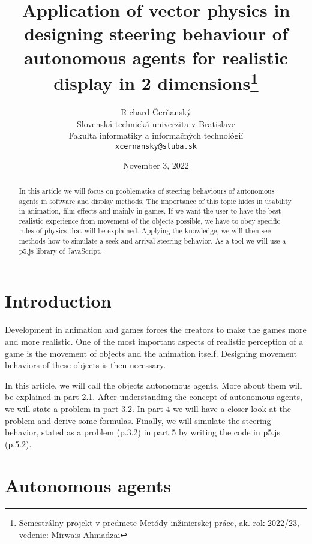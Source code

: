 \documentclass[10pt,twoside,slovak,a4paper]{article}
\title{Application of vector physics in designing steering behaviour of autonomous agents for realistic display in 2 dimensions\thanks{Semestrálny projekt v predmete Metódy inžinierskej práce, ak. rok 2022/23, vedenie: Mirwais Ahmadzai}}
\author{Richard Čerňanský\\[2pt]
	{\small Slovenská technická univerzita v Bratislave}\\
	{\small Fakulta informatiky a informačných technológií}\\
	{\small \texttt{xcernansky@stuba.sk}}
	}
\date{\small November 3, 2022 }
\begin{document}
\maketitle

\begin{abstract}

In this article we will focus on problematics of steering behaviours of autonomous agents in software and display methods. The importance of this topic hides in usability in animation, film effects and mainly in games. If we want the user to have the best realistic experience from movement of the objects possible, we have to obey specific rules of physics that will be explained. Applying the knowledge, we will then see methods how to simulate a seek and arrival steering behavior. As a tool we will use a p5.js library of JavaScript.

\end{abstract}


\section{Introduction}

Development in animation and games forces the creators to make the games more and more realistic. One of the most important aspects of realistic perception of a game is the movement of objects and the animation itself. Designing movement behaviors of these objects is then necessary. 

In this article, we will call the objects autonomous agents. More about them will be explained in part 2.1. After understanding the concept of autonomous agents, we will state a problem in part 3.2. In part 4 we will have a closer look at the problem and derive some formulas. Finally, we will simulate the steering behavior, stated as a problem (p.3.2) in part 5 by writing the code in p5.js (p.5.2).

\section{Autonomous agents} \label{nejaka}






\end{document}
